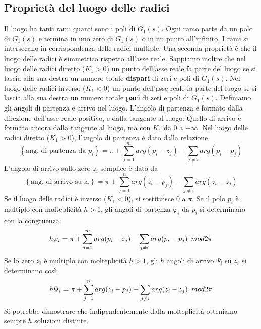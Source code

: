 \documentclass[11pt]{article}
\begin{document}
\subsection{Proprietà del luogo delle radici}
Il luogo ha tanti rami quanti sono i poli di $G_1(s)$. Ogni ramo parte da un polo di $G_1(s)$ e termina in uno zero di $G_1(s)$ o in un punto all'infinito. I rami si intersecano in corrispondenza delle radici multiple. 
Una seconda proprietà è che il luogo delle radici è simmetrico rispetto all'asse reale. 
Sappiamo inoltre che nel luogo delle radici diretto ($K_1>0$) un punto dell'asse reale fa parte del luogo se si lascia alla sua destra un numero totale \textbf{dispari} di zeri e poli di $G_1(s)$. Nel luogo delle radici inverso ($K_1<0$) un punto dell'asse reale fa parte del luogo se si lascia alla sua destra un numero totale \textbf{pari} di zeri e poli di $G_1(s)$.
Definiamo gli angoli di partenza e arrivo nel luogo. L'angolo di partenza è formato dalla direzione dell'asse reale positivo, e dalla tangente al luogo. Quello di arrivo è formato ancora dalla tangente al luogo, ma con $K_1$ da $0$ a $-\infty$.
Nel luogo delle radici diretto ($K_1>0$), l'angolo di partenza è dato dalla relazione
\begin{displaymath}
    \left\{\textrm{ang. di partenza da }p_i\right\}=\pi+\sum_{j=1}^m arg(p_i-z_j) - \sum_{j\neq i} arg(p_i-p_j)
\end{displaymath}
L'angolo di arrivo sullo zero $z_i$ semplice è dato da
\begin{displaymath}
    \left\{\textrm{ang. di arrivo su }z_i\right\} = \pi + \sum_{j=1}^{n} arg(z_i-p_j) - \sum_{j\neq i} arg(z_i-z_j)
\end{displaymath}
Se il luogo delle radici è inverso ($K_1<0$), si sostituisce 0 a $\pi$.
Se il polo $p_i$ è multiplo con molteplicità $h>1$, gli angoli di partenza $\varphi_i$ da $p_i$ si determinano con la congruenza:
\begin{displaymath}
    h\varphi_i = \pi+\sum_{j=1}^m arg(p_i-z_j) - \sum_{j\neq i} arg(p_i-p_j)\hspace{5px}mod2\pi
\end{displaymath}
Se lo zero $z_i$ è multiplo con molteplicità $h>1$, gli $h$ angoli di arrivo $\Psi_i$ su $z_i$ si determinano così:
\begin{displaymath}
    h\Psi_i = \pi + \sum_{j=1}^{n} arg(z_i-p_j) - \sum_{j\neq i} arg(z_i-z_j) \hspace{5px}mod2\pi
\end{displaymath}
Si potrebbe dimostrare che indipendentemente dalla molteplicità otteniamo sempre $h$ soluzioni distinte. 
\end{document}
